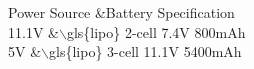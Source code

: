 Power Source	&Battery Specification\\
11.1V	&$\backslash$gls\{lipo\} 2-cell 7.4V 800mAh\\
5V	&$\backslash$gls\{lipo\} 3-cell 11.1V 5400mAh\\
